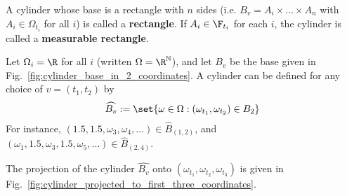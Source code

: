 \documentclass{article} %
\newcommand{\cylinder}[1]{\widehat{#1}}
\begin{document}
\begin{definition}
A cylinder whose base is a rectangle with $n$ sides (i.e. $B_v = A_i \times \hdots \times A_n$ with $A_i \in \Omega_{t_i}$ for all $i$) is called a \textbf{rectangle}.   If $A_i \in \F_{t_i}$ for each $i$, the cylinder is called a \textbf{measurable rectangle}. 
\end{definition}



\begin{example}

Let $\Omega_i = \R$ for all $i$ (written $\Omega = \R^\mathbb{N}$), and let $B_v$ be the base given in Fig.~\ref{fig:cylinder_base_in_2_coordinates}. A cylinder can be defined for any choice of $v=(t_1, t_2)$ by
\begin{align}
\cylinder{B_v} := \set{ \omega \in \Omega : (\omega_{t_1}, \omega_{t_2}) \in B_2 }  
\end{align}
For instance, $(1.5, 1.5, \omega_3, \omega_4, \hdots) \in \cylinder{B}_{(1,2)}$, and  $(\omega_1, 1.5, \omega_3, 1.5, \omega_5, \hdots) \in \cylinder{B}_{(2,4)}$.

The projection of the cylinder $\cylinder{B_v}$ onto $(\omega_{t_1}, \omega_{t_2}, \omega_{t_3})$ is given in Fig.~\ref{fig:cylinder_projected_to_first_three_coordinates}.  


\end{example}
\end{document}
